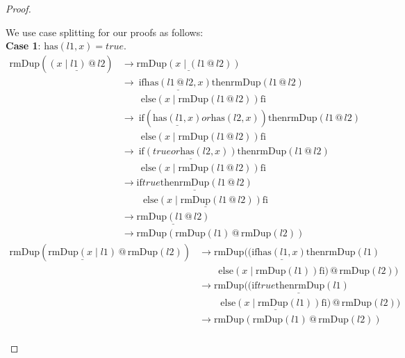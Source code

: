 \documentclass[12pt, a4paper]{article}
\newcommand{\rel}[1]{\mathrel{#1}}
\newcommand{\rmx}[1]{\mathrm{#1}}
\newcommand{\larrow}{\longrightarrow}
\newcommand{\under}{\underline}
\begin{document}
\begin{proof}
\begin{description}
We use case splitting for our proofs as follows: \\
\textbf{Case 1}: $\rmx{has}(l1, x) = true$.
\begin{align*}
\rmx{rmDup}(\under{(x \mid l1) \rel{@} l2})
	&\larrow \under{\rmx{rmDup}(x \mid (l1 \rel{@} l2))} \tag{by @2} \\
	&\larrow\ \rel{\rmx{if}} \under{\rmx{has}(l1 \rel{@} l2, x)} \rel{\rmx{then}} \rmx{rmDup}(l1 \rel{@} l2) \\
	&\quad \quad \rel{\rmx{else}} (x \mid \rmx{rmDup}(l1 \rel{@} l2)) \rel{\rmx{fi}} \tag{by rmDup2} \\
	&\larrow\ \rel{\rmx{if}} (\under{\rmx{has}(l1, x)} \rel{or} \rmx{has}(l2, x)) \rel{\rmx{then}} \rmx{rmDup}(l1 \rel{@} l2) \\
	&\quad \quad \rel{\rmx{else}} (x \mid \rmx{rmDup}(l1 \rel{@} l2)) \rel{\rmx{fi}} \tag{by Problem 6 - Lemma 1} \\
	&\larrow\ \rel{\rmx{if}} \under{(true \rel{or} \rmx{has}(l2, x))} \rel{\rmx{then}} \rmx{rmDup}(l1 \rel{@} l2) \\
	&\quad \quad \rel{\rmx{else}} (x \mid \rmx{rmDup}(l1 \rel{@} l2)) \rel{\rmx{fi}} \tag{by case splitting} \\
	&\larrow \under{\rel{\rmx{if}} true \rel{\rmx{then}} \rmx{rmDup}(l1 \rel{@} l2)} \\
	&\quad \quad\ \under{\rel{\rmx{else}} (x \mid \rmx{rmDup}(l1 \rel{@} l2)) \rel{\rmx{fi}}} \tag{by or} \\
	&\larrow \under{\rmx{rmDup}(l1 \rel{@} l2)} \tag{by if1} \\
	&\larrow \rmx{rmDup}(\rmx{rmDup}(l1) \rel{@} \rmx{rmDup}(l2)) \tag{by IH}
\end{align*}
\begin{align*}
\rmx{rmDup}(\under{\rmx{rmDup}(x \mid l1)} \rel{@} \rmx{rmDup}(l2))
	&\larrow \rmx{rmDup}((\rel{\rmx{if}} \under{\rmx{has}(l1, x)} \rel{\rmx{then}} \rmx{rmDup}(l1) \\
	&\quad \quad \rel{\rmx{else}} (x \mid \rmx{rmDup}(l1)) \rel{\rmx{fi}}) \rel{@} \rmx{rmDup}(l2)) \tag{by rmDup2} \\
	&\larrow \rmx{rmDup}(\under{(\rel{\rmx{if}} true \rel{\rmx{then}} \rmx{rmDup}(l1)} \\
	&\quad \quad\ \under{\rel{\rmx{else}} (x \mid \rmx{rmDup}(l1)) \rel{\rmx{fi}})} \rel{@} \rmx{rmDup}(l2)) \tag{by case splitting} \\
	&\larrow \rmx{rmDup}(\rmx{rmDup}(l1) \rel{@} \rmx{rmDup}(l2)) \tag{by if1} \\
\end{align*}


\end{description}
\end{proof}
\end{document}

